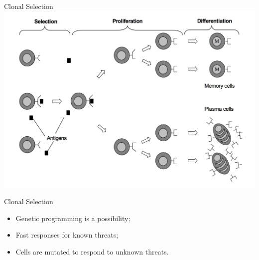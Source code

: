 \documentclass[xcolor=svgnames]{beamer}
\begin{document}
    \begin{frame}{Clonal Selection}
        \includegraphics[width=\textwidth]{fig/clonal_selection}
    \end{frame}
    
    \begin{frame}{Clonal Selection}
        \begin{itemize}
            \item Genetic programming is a possibility;
            \item Fast responses for known threats;
            \item Cells are mutated to respond to unknown threats.
        \end{itemize}
    \end{frame}
    
\end{document}
